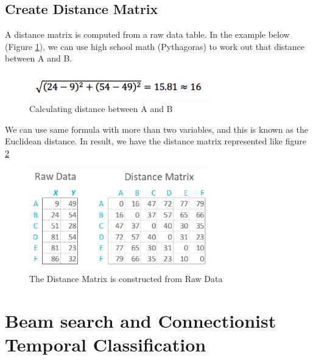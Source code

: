 
\subsection{Create Distance Matrix}
A distance matrix is computed from a raw data table. In the example below (Figure \ref{fig:Chap3-DM_Formula}), we can use high school math (Pythagoras) to work out
that distance between A and B.

\begin{figure}[H]
	\centering
	\includegraphics[width=0.7\textwidth]{img/Chap3/DM_Formula}
	\caption{ Calculating distance between A and B}
	\label{fig:Chap3-DM_Formula}
\end{figure}

We can use same formula with more than two variables, and this is known as
the Euclidean distance.
In result, we have the distance matrix represented like figure \ref{fig:Chap3-DM-Raw}
\begin{figure}[H]
	\centering
	\includegraphics[width=0.7\textwidth]{img/Chap3/DM-Raw}
	\caption{ The Distance Matrix is constructed from Raw Data }
	\label{fig:Chap3-DM-Raw}
\end{figure}

\section{Beam search and Connectionist Temporal Classification}
